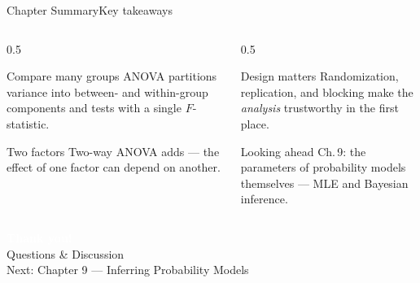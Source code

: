\documentclass[aspectratio=169,11pt]{beamer}
\begin{document}
\begin{frame}{Chapter Summary}{Key takeaways}
  \begin{columns}[T]
    \begin{column}{0.5\textwidth}
      \begin{block}{Compare many groups}
        \small ANOVA partitions variance into between- and within-group
        components and tests with a single $F$-statistic.
      \end{block}
      \begin{exampleblock}{Two factors}
        \small Two-way ANOVA adds  — the effect of
        one factor can depend on another.
      \end{exampleblock}
    \end{column}
    \begin{column}{0.5\textwidth}
      \begin{alertblock}{Design matters}
        \small Randomization, replication, and blocking make the
        \emph{analysis} trustworthy in the first place.
      \end{alertblock}
      \begin{block}{Looking ahead}
        \small Ch.\,9:  the parameters of probability
        models themselves — MLE and Bayesian inference.
      \end{block}
    \end{column}
  \end{columns}
\end{frame}

{
\begin{frame}
  \vfill
  \begin{center}
    {\LARGE\textcolor{white}{\textbf{Thank you!}}}\\[0.6em]
    {\small\textcolor{PrimaryLight}{Questions \& Discussion}}\\[1.2em]
    {\footnotesize\textcolor{AccentYellow}{Next: Chapter 9 — Inferring Probability Models}}
  \end{center}
  \vfill
\end{frame}}
\end{document}
